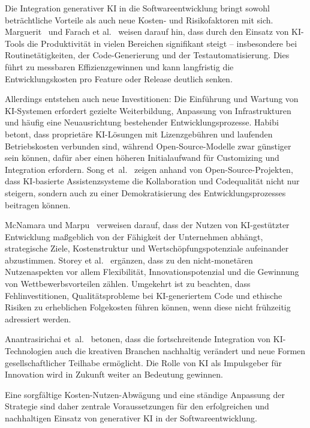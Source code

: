 Die Integration generativer KI in die Softwareentwicklung bringt sowohl
beträchtliche Vorteile als auch neue Kosten- und Risikofaktoren mit sich.
Marguerit~\cite{marguerit_augmenting_2025} und Farach et
al.~\cite{farach_evolving_2025} weisen darauf hin, dass durch den Einsatz von
KI-Tools die Produktivität in vielen Bereichen signifikant steigt –
insbesondere bei Routinetätigkeiten, der Code-Generierung und der
Testautomatisierung. Dies führt zu messbaren Effizienzgewinnen und kann
langfristig die Entwicklungskosten pro Feature oder Release deutlich senken.

Allerdings entstehen auch neue Investitionen: Die Einführung und Wartung von
KI-Systemen erfordert gezielte Weiterbildung, Anpassung von Infrastrukturen und
häufig eine Neuausrichtung bestehender Entwicklungsprozesse.
Habibi~\cite{habibi_open_2025} betont, dass proprietäre KI-Lösungen mit
Lizenzgebühren und laufenden Betriebskosten verbunden sind, während
Open-Source-Modelle zwar günstiger sein können, dafür aber einen höheren
Initialaufwand für Customizing und Integration erfordern. Song
et~al.~\cite{song_impact_2024} zeigen anhand von Open-Source-Projekten, dass
KI-basierte Assistenzsysteme die Kollaboration und Codequalität nicht nur
steigern, sondern auch zu einer Demokratisierung des Entwicklungsprozesses
beitragen können.

McNamara und Marpu~\cite{mcnamara_exponential_2025} verweisen darauf, dass der
Nutzen von KI-gestützter Entwicklung maßgeblich von der Fähigkeit der
Unternehmen abhängt, strategische Ziele, Kostenstruktur und
Wertschöpfungspotenziale aufeinander abzustimmen. Storey et
al.~\cite{storey_generative_2025} ergänzen, dass zu den nicht-monetären
Nutzenaspekten vor allem Flexibilität, Innovationspotenzial und die Gewinnung
von Wettbewerbsvorteilen zählen. Umgekehrt ist zu beachten, dass
Fehlinvestitionen, Qualitätsprobleme bei KI-generiertem Code und ethische
Risiken zu erheblichen Folgekosten führen können, wenn diese nicht frühzeitig
adressiert werden.

Anantrasirichai et~al.~\cite{anantrasirichai_artificial_2025} betonen, dass die
fortschreitende Integration von KI-Technologien auch die kreativen Branchen
nachhaltig verändert und neue Formen gesellschaftlicher Teilhabe ermöglicht.
Die Rolle von KI als Impulsgeber für Innovation wird in Zukunft weiter an
Bedeutung gewinnen.

Eine sorgfältige Kosten-Nutzen-Abwägung und eine ständige Anpassung der
Strategie sind daher zentrale Voraussetzungen für den erfolgreichen und
nachhaltigen Einsatz von generativer KI in der Softwareentwicklung.


